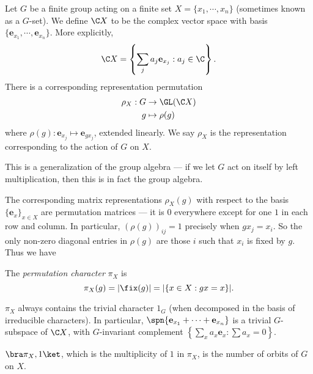 \documentclass[a4paper]{article}
\begin{document}
Let $G$ be a finite group acting on a finite set $X = \{x_1, \cdots, x_n\}$ (sometimes known as a $G$-set). We define $\C X$ to be the complex vector space with basis $\{\mathbf{e}_{x_1}, \cdots, \mathbf{e}_{x_n}\}$. More explicitly,
\[
  \C X = \left\{ \sum_j a_j \mathbf{e}_{x_j}: a_j \in \C\right\}.
\]
There is a corresponding representation permutation
\begin{align*}
  \rho_X: G &\to \GL(\C X)\\
  g &\mapsto \rho(g)
\end{align*}
where $\rho(g): \mathbf{e}_{x_j} \mapsto \mathbf{e}_{g x_j}$, extended linearly. We say $\rho_X$ is the representation corresponding to the action of $G$ on $X$.

This is a generalization of the group algebra --- if we let $G$ act on itself by left multiplication, then this is in fact the group algebra.

The corresponding matrix representations $\rho_X(g)$ with respect to the basis $\{\mathbf{e}_x\}_{x \in X}$ are permutation matrices --- it is $0$ everywhere except for one $1$ in each row and column. In particular, $(\rho(g))_{ij} = 1$ precisely when $g x_j = x_i$. So the only non-zero diagonal entries in $\rho(g)$ are those $i$ such that $x_i$ is fixed by $g$. Thus we have

\begin{defi}
  The \emph{permutation character} $\pi_X$ is
  \[
    \pi_X(g) = |\fix(g)| = |\{x \in X: gx = x\}|.
  \]
\end{defi}

\begin{lemma}
  $\pi_X$ always contains the trivial character $1_G$ (when decomposed in the basis of irreducible characters). In particular, $\spn\{\mathbf{e}_{x_1}+ \cdots+ \mathbf{e}_{x_n}\}$ is a trivial $G$-subspace of $\C X$, with $G$-invariant complement $\left\{\sum_x a_x \mathbf{e}_x: \sum a_x = 0\right\}$.
\end{lemma}

\begin{lemma}
  $\bra \pi_X, 1\ket$, which is the multiplicity of $1$ in $\pi_X$, is the number of orbits of $G$ on $X$.
\end{lemma}
\end{document}
